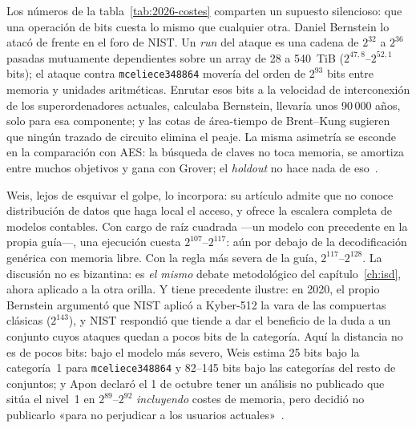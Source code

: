 \documentclass[11pt,a4paper,oneside]{report}
\begin{document}
Los números de la tabla~\ref{tab:2026-costes} comparten un supuesto
silencioso: que una operación de bits cuesta lo mismo que cualquier
otra. Daniel Bernstein lo atacó de frente en el foro de NIST. Un
\emph{run} del ataque es una cadena de $2^{32}$ a $2^{36}$ pasadas
mutuamente dependientes sobre un array de 28 a 540~TiB
($2^{47{,}8}$--$2^{52{,}1}$ bits); el ataque contra
\texttt{mceliece348864} movería del orden de $2^{93}$ bits entre
memoria y unidades aritméticas. Enrutar esos bits a la velocidad de
interconexión de los superordenadores actuales, calculaba Bernstein,
llevaría unos 90\,000 años, solo para esa componente; y las cotas
de área-tiempo de Brent--Kung sugieren que ningún trazado de
circuito elimina el peaje. La misma asimetría se esconde en la
comparación con AES: la búsqueda de claves no toca memoria, se
amortiza entre muchos objetivos y gana con Grover; el
\emph{holdout} no hace nada de eso~\cite{bernstein2026}.

Weis, lejos de esquivar el golpe, lo incorpora: su artículo admite
que no conoce distribución de datos que haga local el acceso, y
ofrece la escalera completa de modelos contables. Con cargo de
raíz cuadrada ---un modelo con precedente en la propia guía---, una
ejecución cuesta $2^{107}$--$2^{117}$: aún por debajo de la
decodificación genérica con memoria libre. Con la regla más severa
de la guía, $2^{117}$--$2^{128}$. La discusión no es bizantina: es
\emph{el mismo} debate metodológico del capítulo~\ref{ch:isd},
ahora aplicado a la otra orilla. Y tiene precedente ilustre: en
2020, el propio Bernstein argumentó que NIST aplicó a Kyber-512 la
vara de las compuertas clásicas ($2^{143}$), y NIST respondió que
tiende a dar el beneficio de la duda a un conjunto cuyos ataques
quedan a pocos bits de la categoría. Aquí la distancia no es de
pocos bits: bajo el modelo más severo, Weis estima 25 bits bajo la
categoría~1 para \texttt{mceliece348864} y 82--145 bits bajo las
categorías del resto de conjuntos; y Apon declaró el 1 de octubre
tener un análisis no publicado que sitúa el nivel~1 en
$2^{89}$--$2^{92}$ \emph{incluyendo} costes de memoria, pero
decidió no publicarlo «para no perjudicar a los usuarios
actuales»~\cite{weis2026,bernstein2026}.
\end{document}
